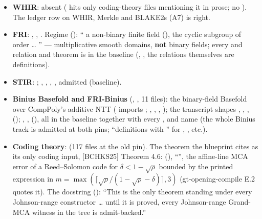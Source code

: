 \begin{itemize}
\item \textbf{WHIR}: absent ( hits only coding-theory files mentioning
  it in prose; no ). The ledger row on WHIR, Merkle and BLAKE2s (A7) is
  right.
\item \textbf{FRI}: ,
  , . Regime
  (): `` a non-binary finite field
  (\code{[NonBinaryField F]}),  the cyclic subgroup of order  \ldots{}
  '' --- multiplicative smooth domains, \textbf{not} binary fields;
  every  and  relation and theorem is in the baseline
  (, , the relations themselves are
   definitions).
\item \textbf{STIR}: ; ,
  , , ,
   admitted (baseline).
\item \textbf{Binius Basefold and FRI-Binius} (,
  , 11 files): the binary-field Basefold over CompPoly's additive NTT
  ( imports
  ; ,
  , , ); the transcript shapes
  , , , 
  (); ,
  ,
   (), all in the baseline together with every
  ,  and
   name (the whole Binius track is admitted at both pins;
  ``definitions with '' for , ,
  etc.).
\item \textbf{Coding theory}:  (117 files at the old pin). The theorem
  the blueprint cites as its only coding input, [BCHKS25] Theorem 4.6:
  (), ``'',
  the affine-line MCA error of a Reed--Solomon code for $\delta < 1 - \sqrt{\rho}$ bounded by the
  printed expression in $m = \max(\lceil \sqrt{\rho}/(1-\sqrt{\rho}-\delta) \rceil, 3)$
  (gt-opening-compile E.2 quotes it). The docstring (): ``This is the only
  theorem standing under every Johnson-range  constructor \ldots{} until it
  is proved, every Johnson-range Grand-MCA witness in the tree is admit-backed.''
\end{itemize}

